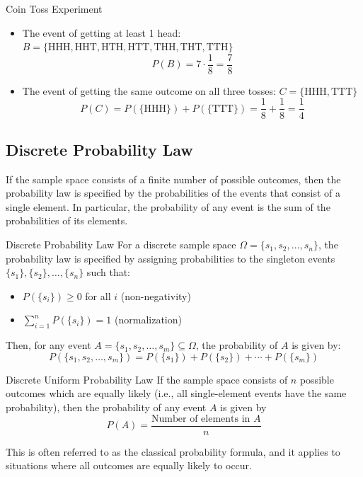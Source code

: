 \begin{exampleboxbreak}{Coin Toss Experiment}
\begin{itemize}
    \item The event of getting at least 1 head: $B = \{\text{HHH}, \text{HHT}, \text{HTH}, \text{HTT}, \text{THH}, \text{THT}, \text{TTH}\}$
    \[P(B) = 7 \cdot \frac{1}{8} = \frac{7}{8}\]
    
    \item The event of getting the same outcome on all three tosses: $C = \{\text{HHH}, \text{TTT}\}$
    \[P(C) = P(\{\text{HHH}\}) + P(\{\text{TTT}\}) = \frac{1}{8} + \frac{1}{8} = \frac{1}{4}\]
\end{itemize}

\end{exampleboxbreak}


\subsection{Discrete Probability Law}

If the sample space consists of a finite number of possible outcomes, then the probability law is specified by the probabilities of the events that consist of a single element. In particular, the probability of any event is the sum of the probabilities of its elements.

\begin{definitionboxbreak}{Discrete Probability Law}
For a discrete sample space $\Omega = \{s_1, s_2, \ldots, s_n\}$, the probability law is specified by assigning probabilities to the singleton events $\{s_1\}, \{s_2\}, \ldots, \{s_n\}$ such that:
\begin{itemize}
    \item $P(\{s_i\}) \geq 0$ for all $i$ (non-negativity)
    \item $\sum_{i=1}^{n} P(\{s_i\}) = 1$ (normalization)
\end{itemize}
Then, for any event $A = \{s_1, s_2, \ldots, s_m\} \subseteq \Omega$, the probability of $A$ is given by:
\[P(\{s_1, s_2, \ldots, s_m\}) = P(\{s_1\}) + P(\{s_2\}) + \cdots + P(\{s_m\})\]
\end{definitionboxbreak}

\begin{definitionboxbreak}{Discrete Uniform Probability Law}
    If the sample space consists of $n$ possible outcomes which are equally likely (i.e., all single-element events have the same probability), then the probability of any event $A$ is given by
    \[P(A) = \frac{\text{Number of elements in }A}{n}\]

    This is often referred to as the classical probability formula, and it applies to situations where all outcomes are equally likely to occur.
\end{definitionboxbreak}

